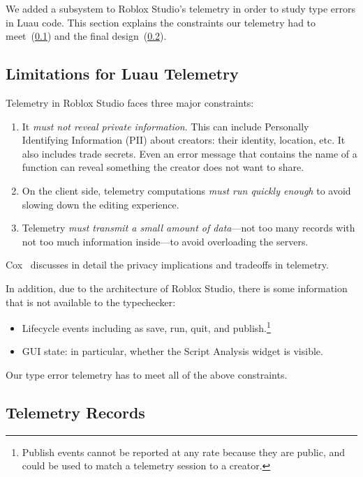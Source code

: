 \documentclass[english,submission,cleveref]{programming}
\begin{document}
We added a subsystem to Roblox Studio's telemetry in order to study type errors
in Luau code.
This section explains the constraints our telemetry had to meet~(\cref{s:tel-limitations})
and the final design~(\cref{s:telemetry-records}).


\subsection{Limitations for Luau Telemetry}
\label{s:tel-limitations}

Telemetry in Roblox Studio faces three major constraints:
\begin{enumerate}

  \item
    It \emph{must not reveal private information}.
    This can include Personally Identifying Information (PII) about creators: their identity, location, etc.
    It also includes trade secrets. Even an error message that contains the
    name of a function can reveal something the creator does not want to share.

  \item
    On the client side, telemetry computations \emph{must run quickly enough} to avoid
    slowing down the editing experience.

  \item
    Telemetry \emph{must transmit a small amount of data}---not too many records
    with not too much information inside---to avoid overloading the servers.

\end{enumerate}
Cox~\cite{transparent-telemetry} discusses in detail the privacy implications
and tradeoffs in telemetry.

In addition, due to the architecture of Roblox Studio,
there is some information that is not available to the
typechecker:
\begin{itemize}
  \item
    Lifecycle events including as save, run, quit, and publish.\footnote{Publish events
    cannot be reported at any rate because they are public, and could be used
    to match a telemetry session to a creator.}
  \item
    GUI state: in particular, whether the Script Analysis widget is visible.
\end{itemize}
Our type error telemetry has to meet all of the above constraints.


\subsection{Telemetry Records}
\label{s:telemetry-records}
\end{document}
